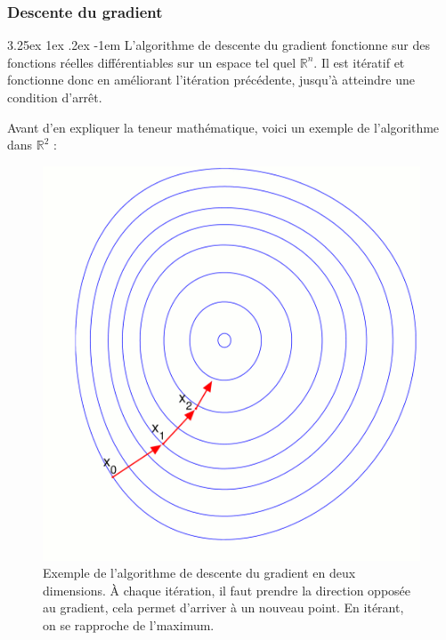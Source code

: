 \documentclass[a4paper, 11pt]{article}
\makeatletter
\renewcommand\paragraph{\@startsection{paragraph}{5}{\z@}%
  {3.25ex \@plus1ex \@minus.2ex}%
  {-1em}%
  {\normalfont\normalsize\bfseries}}
\makeatother
\begin{document}
\subsubsection{Descente du gradient}
\paragraph{}
L'algorithme de descente du gradient fonctionne sur des fonctions réelles différentiables sur un espace tel quel $\mathbb{R}^n$. Il est itératif et fonctionne donc en améliorant l'itération précédente, jusqu'à atteindre une condition d'arrêt.

Avant d'en expliquer la teneur mathématique, voici un exemple de l'algorithme dans $\mathbb{R}^2$ :

\begin{figure}[H]
\centering
\includegraphics[scale=0.40]{images/descente_gradient_exemple}
\caption[]{Exemple de l'algorithme de descente du gradient en deux dimensions. À chaque itération, il faut prendre la direction opposée au gradient\footnotemark, cela permet d'arriver à un nouveau point. En itérant, on se rapproche de l'maximum. }
\end{figure}

\end{document}
